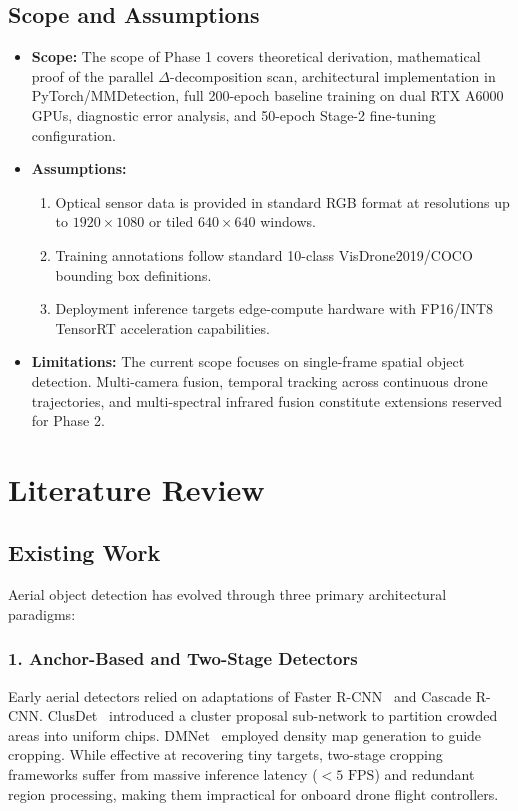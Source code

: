 \documentclass[12pt,a4paper]{report}
\begin{document}
\section{Scope and Assumptions}
\begin{itemize}[leftmargin=2em]
    \item \textbf{Scope:} The scope of Phase 1 covers theoretical derivation, mathematical proof of the parallel $\Delta$-decomposition scan, architectural implementation in PyTorch/MMDetection, full 200-epoch baseline training on dual RTX A6000 GPUs, diagnostic error analysis, and 50-epoch Stage-2 fine-tuning configuration.
    \item \textbf{Assumptions:} 
    \begin{enumerate}
        \item Optical sensor data is provided in standard RGB format at resolutions up to $1920 \times 1080$ or tiled $640 \times 640$ windows.
        \item Training annotations follow standard 10-class VisDrone2019/COCO bounding box definitions.
        \item Deployment inference targets edge-compute hardware with FP16/INT8 TensorRT acceleration capabilities.
    \end{enumerate}
    \item \textbf{Limitations:} The current scope focuses on single-frame spatial object detection. Multi-camera fusion, temporal tracking across continuous drone trajectories, and multi-spectral infrared fusion constitute extensions reserved for Phase 2.
\end{itemize}

\chapter{Literature Review}

\section{Existing Work}
Aerial object detection has evolved through three primary architectural paradigms:

\subsection{1. Anchor-Based and Two-Stage Detectors}
Early aerial detectors relied on adaptations of Faster R-CNN~\cite{ren2015faster} and Cascade R-CNN. ClusDet~\cite{yang2019clusdet} introduced a cluster proposal sub-network to partition crowded areas into uniform chips. DMNet~\cite{li2020density} employed density map generation to guide cropping. While effective at recovering tiny targets, two-stage cropping frameworks suffer from massive inference latency ($<5\text{ FPS}$) and redundant region processing, making them impractical for onboard drone flight controllers.
\end{document}
